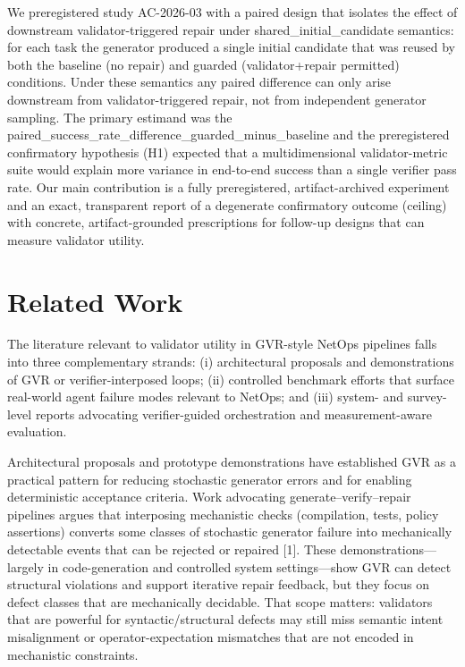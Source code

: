 \documentclass[conference]{IEEEtran}
\begin{document}
We preregistered study AC-2026-03 with a paired design that isolates the effect of downstream validator-triggered repair under shared\_initial\_candidate semantics: for each task the generator produced a single initial candidate that was reused by both the baseline (no repair) and guarded (validator+repair permitted) conditions. Under these semantics any paired difference can only arise downstream from validator-triggered repair, not from independent generator sampling. The primary estimand was the paired\_success\_rate\_difference\_guarded\_minus\_baseline and the preregistered confirmatory hypothesis (H1) expected that a multidimensional validator-metric suite would explain more variance in end-to-end success than a single verifier pass rate. Our main contribution is a fully preregistered, artifact-archived experiment and an exact, transparent report of a degenerate confirmatory outcome (ceiling) with concrete, artifact-grounded prescriptions for follow-up designs that can measure validator utility.

\section{Related Work}
The literature relevant to validator utility in GVR-style NetOps pipelines falls into three complementary strands: (i) architectural proposals and demonstrations of GVR or verifier-interposed loops; (ii) controlled benchmark efforts that surface real-world agent failure modes relevant to NetOps; and (iii) system- and survey-level reports advocating verifier-guided orchestration and measurement-aware evaluation.

Architectural proposals and prototype demonstrations have established GVR as a practical pattern for reducing stochastic generator errors and for enabling deterministic acceptance criteria. Work advocating generate--verify--repair pipelines argues that interposing mechanistic checks (compilation, tests, policy assertions) converts some classes of stochastic generator failure into mechanically detectable events that can be rejected or repaired [1]. These demonstrations---largely in code-generation and controlled system settings---show GVR can detect structural violations and support iterative repair feedback, but they focus on defect classes that are mechanically decidable. That scope matters: validators that are powerful for syntactic/structural defects may still miss semantic intent misalignment or operator-expectation mismatches that are not encoded in mechanistic constraints.
\end{document}
